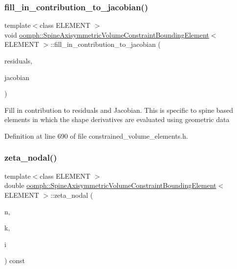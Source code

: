 \subsubsection{\texorpdfstring{fill\+\_\+in\+\_\+contribution\+\_\+to\+\_\+jacobian()}{fill\_in\_contribution\_to\_jacobian()}}
{\footnotesize\ttfamily template$<$class E\+L\+E\+M\+E\+NT $>$ \\
void \hyperlink{classoomph_1_1SpineAxisymmetricVolumeConstraintBoundingElement}{oomph\+::\+Spine\+Axisymmetric\+Volume\+Constraint\+Bounding\+Element}$<$ E\+L\+E\+M\+E\+NT $>$\+::fill\+\_\+in\+\_\+contribution\+\_\+to\+\_\+jacobian (\begin{DoxyParamCaption}\item[{Vector$<$ double $>$ \&}]{residuals,  }\item[{Dense\+Matrix$<$ double $>$ \&}]{jacobian }\end{DoxyParamCaption})\hspace{0.3cm}{\ttfamily [inline]}}

Fill in contribution to residuals and Jacobian. This is specific to spine based elements in which the shape derivatives are evaluated using geometric data 

Definition at line 690 of file constrained\+\_\+volume\+\_\+elements.\+h.

\mbox{\label{classoomph_1_1SpineAxisymmetricVolumeConstraintBoundingElement_ae15b2d0563f79ea10d23a1286831143a}} 
\subsubsection{\texorpdfstring{zeta\+\_\+nodal()}{zeta\_nodal()}}
{\footnotesize\ttfamily template$<$class E\+L\+E\+M\+E\+NT $>$ \\
double \hyperlink{classoomph_1_1SpineAxisymmetricVolumeConstraintBoundingElement}{oomph\+::\+Spine\+Axisymmetric\+Volume\+Constraint\+Bounding\+Element}$<$ E\+L\+E\+M\+E\+NT $>$\+::zeta\+\_\+nodal (\begin{DoxyParamCaption}\item[{const unsigned \&}]{n,  }\item[{const unsigned \&}]{k,  }\item[{const unsigned \&}]{i }\end{DoxyParamCaption}) const\hspace{0.3cm}{\ttfamily [inline]}}



